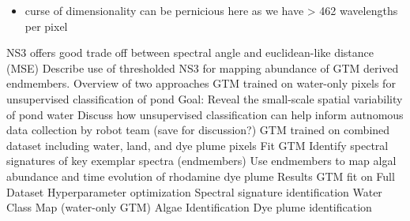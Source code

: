 \documentclass{article}
\begin{document}
\begin{outline}[enumerate]
\begin{itemize}
                    \item curse of dimensionality can be pernicious here as we have > 462 wavelengths per pixel
                \end{itemize}
            \4 NS3 offers good trade off between spectral angle and euclidean-like distance (MSE)
        \3 Describe use of thresholded NS3 for mapping abundance of GTM derived endmembers.
    \2 Overview of two approaches
        \3 GTM trained on water-only pixels for unsupervised classification of pond
            \4 Goal: Reveal the small-scale spatial variability of pond water
            \4 Discuss how unsupervised classification can help inform autnomous data collection by robot team (save for discussion?)
        \3 GTM trained on combined dataset including water, land, and dye plume pixels
            \4 Fit GTM
            \4 Identify spectral signatures of key exemplar spectra (endmembers)
            \4 Use endmembers to map algal abundance and time evolution of rhodamine dye plume
\1 Results
    \2  GTM fit on Full Dataset
    \2 Hyperparameter optimization
    \2 Spectral signature identification
    \2 Water Class Map (water-only GTM)
    \2 Algae Identification
    \2 Dye plume identification


\end{outline}
\end{document}
